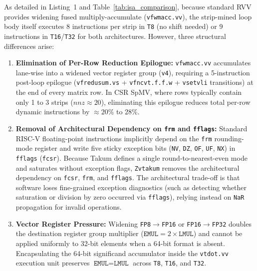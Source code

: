 \documentclass[conference]{IEEEtran}
\begin{document}
As detailed in Listing~1 and Table~\ref{tab:isa_comparison}, because standard RVV provides widening fused multiply-accumulate (\texttt{vfwmacc.vv}), the strip-mined loop body itself executes 8 instructions per strip in \texttt{T8} (no shift needed) or 9 instructions in \texttt{T16}/\texttt{T32} for both architectures. However, three structural differences arise:
\begin{enumerate}
    \item \textbf{Elimination of Per-Row Reduction Epilogue:} \texttt{vfwmacc.vv} accumulates lane-wise into a widened vector register group (\texttt{v4}), requiring a 5-instruction post-loop epilogue (\texttt{vfredusum.vs} + \texttt{vfncvt.f.f.w} + \texttt{vsetvli} transitions) at the end of every matrix row. In CSR SpMV, where rows typically contain only 1 to 3 strips ($nnz \approx 20$), eliminating this epilogue reduces total per-row dynamic instructions by $\approx 20\%$ to $28\%$.
    \item \textbf{Removal of Architectural Dependency on \texttt{frm} and \texttt{fflags}:} Standard RISC-V floating-point instructions implicitly depend on the \texttt{frm} rounding-mode register and write five sticky exception bits (\texttt{NV}, \texttt{DZ}, \texttt{OF}, \texttt{UF}, \texttt{NX}) in \texttt{fflags} (\texttt{fcsr}). Because Takum defines a single round-to-nearest-even mode and saturates without exception flags, \texttt{Zvtakum} removes the architectural dependency on \texttt{fcsr}, \texttt{frm}, and \texttt{fflags}. The architectural trade-off is that software loses fine-grained exception diagnostics (such as detecting whether saturation or division by zero occurred via \texttt{fflags}), relying instead on \texttt{NaR} propagation for invalid operations.
    \item \textbf{Vector Register Pressure:} Widening \texttt{FP8}$\to$\texttt{FP16} or \texttt{FP16}$\to$\texttt{FP32} doubles the destination register group multiplier ($\texttt{EMUL} = 2 \times \texttt{LMUL}$) and cannot be applied uniformly to 32-bit elements when a 64-bit format is absent. Encapsulating the 64-bit significand accumulator inside the \texttt{vtdot.vv} execution unit preserves $\texttt{EMUL} = \texttt{LMUL}$ across \texttt{T8}, \texttt{T16}, and \texttt{T32}.
\end{enumerate}
\end{document}
